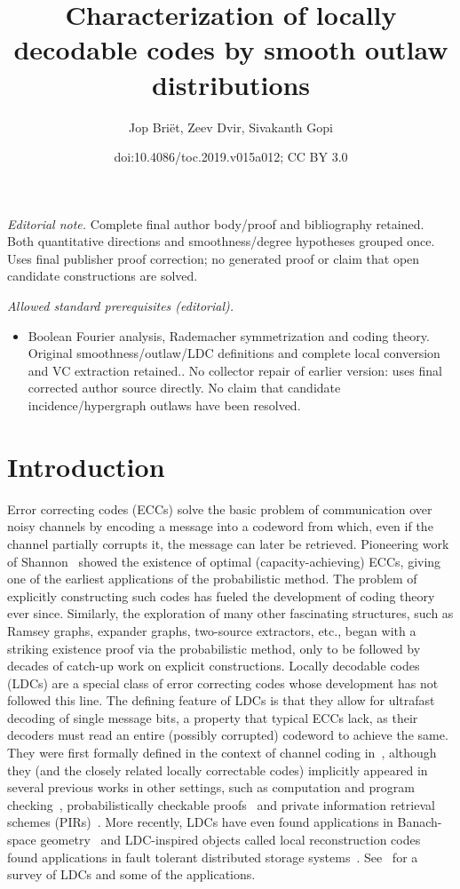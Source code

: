 \documentclass[11pt]{article}
\title{Characterization of locally decodable codes by smooth outlaw distributions}
\author{Jop Briët, Zeev Dvir, Sivakanth Gopi}
\date{doi:10.4086/toc.2019.v015a012; CC BY 3.0}
\numberwithin{equation}{section}
\theoremstyle{definition}
\theoremstyle{plain}
\begin{document}
\maketitle
\noindent\textit{Editorial note.} Complete final author body/proof and bibliography retained. Both quantitative directions and smoothness/degree hypotheses grouped once. Uses final publisher proof correction; no generated proof or claim that open candidate constructions are solved.\par\medskip
\noindent\textit{Allowed standard prerequisites (editorial).}\begin{itemize}
\item Boolean Fourier analysis, Rademacher symmetrization and coding theory. Original smoothness/outlaw/LDC definitions and complete local conversion and VC extraction retained.. No collector repair of earlier version: uses final corrected author source directly. No claim that candidate incidence/hypergraph outlaws have been resolved.
\end{itemize}\medskip
\section{Introduction}

Error correcting codes (ECCs) solve the basic problem of communication over noisy channels by encoding a message into a codeword from which, even if the channel partially corrupts it, the message can later be retrieved.
Pioneering work of Shannon~\cite{Shannon:1948} showed the existence of optimal (capacity-achieving) ECCs, giving one of the earliest applications of the probabilistic method. %
The problem of explicitly constructing such codes has fueled the development of coding theory ever since.
Similarly, the exploration of many other fascinating structures, such as Ramsey graphs, expander graphs, 
two-source extractors, %
etc., began with a striking existence proof  via the probabilistic method, only to be followed by decades of catch-up work on explicit constructions.
Locally decodable codes (LDCs) are a special class of error correcting codes whose development has not followed this line.
The defining feature of LDCs is that they allow for ultrafast %
decoding of single message bits, a property that typical ECCs lack, as their decoders must read an entire (possibly corrupted) codeword to achieve the same.
They were first formally defined in the context of channel coding in~\cite{Katz:2000}, although they (and the closely related locally correctable codes) implicitly appeared in several previous works in other settings, such as computation and program checking~\cite{bfls, BK95}, probabilistically checkable proofs~\cite{AS98,ALMSS98} and private information retrieval schemes (PIRs)~\cite{CKGS98}. More recently, LDCs have even found applications in Banach-space geometry~\cite{Briet:2012d} and LDC-inspired objects called local reconstruction codes found applications in fault tolerant distributed storage systems~\cite{GHSY12}. See~\cite{Yekhanin:2012} for a survey of LDCs and some of the applications.
\end{document}
